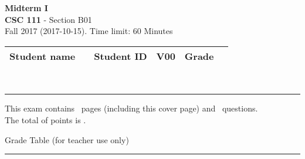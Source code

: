 \documentclass[12pt]{exam}
\newcommand{\class}{CSC 111}
\renewcommand{\section}{B01}
\newcommand{\term}{Fall 2017}
\newcommand{\examtitle}{Midterm I}
\newcommand{\examdate}{2017-10-15}
\newcommand{\timelimit}{60 Minutes}
\begin{document}
\noindent
\textbf{\examtitle} \\
\textbf{\class} - Section \section \\
\term{} (\examdate). Time limit: \timelimit \\

\noindent
\begin{tabularx}{\textwidth}{|X|X|X|X|X|X|}
	\hline
	\small{Student name} & \small{} & \small{Student ID} & \small\bfseries{V00} & \small{Grade} & \small{} \\
	\hline
\end{tabularx}

\noindent \\
\rule[2ex]{\textwidth}{2pt}

\noindent
This exam contains \numpages\ pages (including this cover page) and \numquestions\ questions. \\
The total of points is \numpoints.

\begin{center}
\small{Grade Table (for teacher use only)} \\
\addpoints
\gradetable[v][questions]
\end{center}

\noindent
\rule[2ex]{\textwidth}{2pt}
\end{document}
